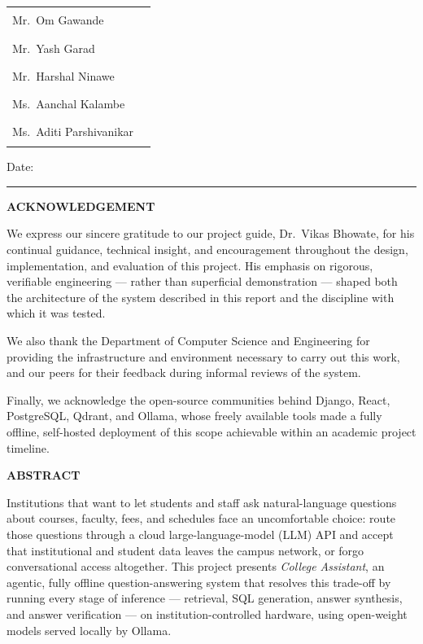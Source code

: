 \documentclass[11pt,a4paper,oneside]{report}
\begin{document}
\vspace{2cm}
\renewcommand{\arraystretch}{2.0}
\begin{tabularx}{\linewidth}{Xr}
Mr.\ Om Gawande & \rule{4cm}{0.4pt} \\
Mr.\ Yash Garad & \rule{4cm}{0.4pt} \\
Mr.\ Harshal Ninawe & \rule{4cm}{0.4pt} \\
Ms.\ Aanchal Kalambe & \rule{4cm}{0.4pt} \\
Ms.\ Aditi Parshivanikar & \rule{4cm}{0.4pt} \\
\end{tabularx}

\vspace{1cm}
\noindent Date: \rule{5cm}{0.4pt}

\clearpage

\thispagestyle{empty}
\begin{center}
{\Large \bfseries ACKNOWLEDGEMENT}
\end{center}
\vspace{1cm}

\noindent We express our sincere gratitude to our project guide, Dr.\ Vikas
Bhowate, for his continual guidance, technical insight, and encouragement
throughout the design, implementation, and evaluation of this project. His
emphasis on rigorous, verifiable engineering --- rather than superficial
demonstration --- shaped both the architecture of the system described in
this report and the discipline with which it was tested.

We also thank the Department of Computer Science and Engineering for
providing the infrastructure and environment necessary to carry out this
work, and our peers for their feedback during informal reviews of the system.

Finally, we acknowledge the open-source communities behind Django, React,
PostgreSQL, Qdrant, and Ollama, whose freely available tools made a fully
offline, self-hosted deployment of this scope achievable within an academic
project timeline.

\clearpage

\thispagestyle{empty}
\begin{center}
{\Large \bfseries ABSTRACT}
\end{center}
\vspace{0.8cm}

\noindent Institutions that want to let students and staff ask natural-language
questions about courses, faculty, fees, and schedules face an uncomfortable
choice: route those questions through a cloud large-language-model (LLM) API
and accept that institutional and student data leaves the campus network, or
forgo conversational access altogether. This project presents \emph{College
Assistant}, an agentic, fully offline question-answering system that resolves
this trade-off by running every stage of inference --- retrieval, SQL
generation, answer synthesis, and answer verification --- on
institution-controlled hardware, using open-weight models served locally by
Ollama.
\end{document}
